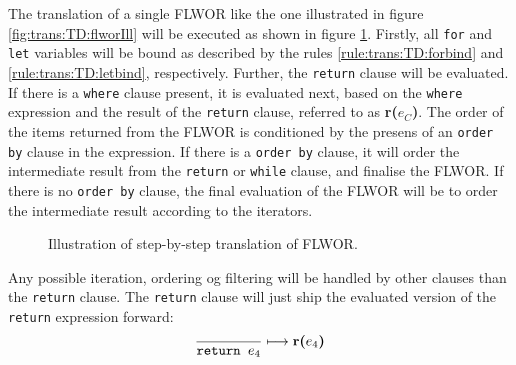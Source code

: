 The translation of a single FLWOR like the one illustrated in figure \ref{fig:trans:TD:flworIll} will be executed
as shown in figure \ref{fig:trans:TD:flworExecute}. Firstly, all \texttt{for} and \texttt{let} variables will be
bound as described by the rules \ref{rule:trans:TD:forbind} and \ref{rule:trans:TD:letbind}, respectively.
Further, the \texttt{return} clause will be evaluated. If there is a \texttt{where} clause present, it is
evaluated next, based on the \texttt{where} expression and the result of the \texttt{return} clause, referred to as
\textbf{r(}$e_{C}$\textbf{)}. The order of the items returned from the FLWOR is conditioned by the presens of an
\texttt{order by} clause in the expression. If there is a \texttt{order by} clause, it will order the intermediate
result from the \texttt{return} or \texttt{while} clause, and finalise the FLWOR. If there is no \texttt{order by}
clause, the final evaluation of the FLWOR will be to order the intermediate result according to the iterators.

\begin{figure}[h]
\centering

\label{fig:trans:TD:flworExecute}
\caption[FLWOR translation order]{Illustration of step-by-step translation of FLWOR.}
\end{figure}



Any possible iteration, ordering og filtering will be handled by other clauses than the \texttt{return} clause.
The \texttt{return} clause will just ship the evaluated version of the \texttt{return} expression forward:
\begin{equation}
\frac{}{\mbox{\texttt{return }}e_{4}}\longmapsto
\mbox{\textbf{r(}}e_{4}\mbox{\textbf{)}}
\label{rule:trans:TD:returnTaint}
\end{equation}


